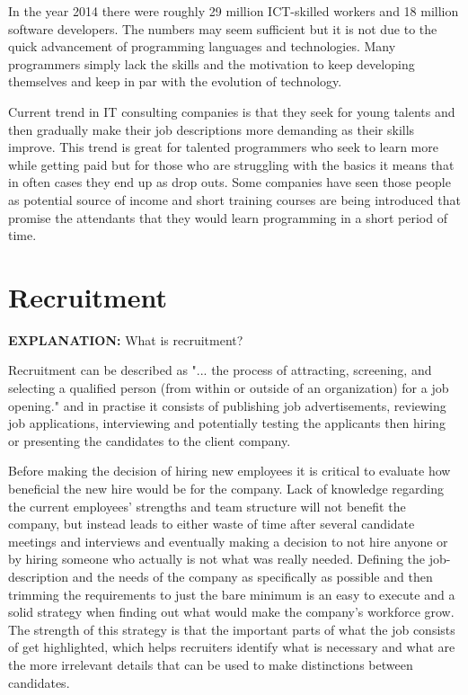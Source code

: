 \documentclass[11pt,a4paper,oneside,article]{memoir}
\begin{document}
In the year 2014 there were roughly 29 million ICT-skilled workers and 18 million software developers. \cite{idc:numberof} The numbers may seem sufficient but it is not due to the quick advancement of programming languages and technologies. Many programmers simply lack the skills and the motivation to keep developing themselves and keep in par with the evolution of technology.

Current trend in IT consulting companies is that they seek for young talents and then gradually make their job descriptions more demanding as their skills improve. This trend is great for talented programmers who seek to learn more while getting paid but for those who are struggling with the basics it means that in often cases they end up as drop outs. Some companies have seen those people as potential source of income and short training courses are being introduced that promise the attendants that they would learn programming in a short period of time.

\section{Recruitment}
\textbf{EXPLANATION:} What is recruitment?

Recruitment can be described as "... the process of attracting, screening, and selecting a qualified person (from within or outside of an organization) for a job opening." \cite[p.~1]{konceptanalytics:book} and in practise it consists of publishing job advertisements, reviewing job applications, interviewing and potentially testing the applicants then hiring or presenting the candidates to the client company.

Before making the decision of hiring new employees it is critical to evaluate how beneficial the new hire would be for the company. Lack of knowledge regarding the current employees' strengths and team structure will not benefit the company, but instead leads to either waste of time after several candidate meetings and interviews and eventually making a decision to not hire anyone or by hiring someone who actually is not what %
was really needed. Defining the job-description and the needs of the company as specifically as possible and then trimming the requirements to just the bare minimum is an easy to execute and a solid strategy when finding out what would make the company's workforce grow. The strength of this strategy is that the important parts of what the job consists of get highlighted, which helps recruiters identify what is necessary and what are the more irrelevant details that can be used to make distinctions between candidates.
\end{document}

